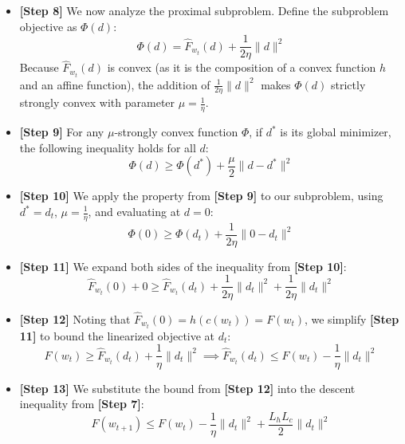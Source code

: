 \documentclass[11pt]{article}
\begin{document}
\begin{itemize}
    \item \textbf{[Step 8]} We now analyze the proximal subproblem. Define the subproblem objective as $\Phi(d)$:
    \begin{equation}
        \Phi(d) = \hat{F}_{w_t}(d) + \frac{1}{2\eta} \|d\|^2
    \end{equation}
    Because $\hat{F}_{w_t}(d)$ is convex (as it is the composition of a convex function $h$ and an affine function), the addition of $\frac{1}{2\eta}\|d\|^2$ makes $\Phi(d)$ strictly strongly convex with parameter $\mu = \frac{1}{\eta}$.
    
    \item \textbf{[Step 9]} For any $\mu$-strongly convex function $\Phi$, if $d^*$ is its global minimizer, the following inequality holds for all $d$:
    \begin{equation}
        \Phi(d) \geq \Phi(d^*) + \frac{\mu}{2} \|d - d^*\|^2
    \end{equation}
    
    \item \textbf{[Step 10]} We apply the property from \textbf{[Step 9]} to our subproblem, using $d^* = d_t$, $\mu = \frac{1}{\eta}$, and evaluating at $d = 0$:
    \begin{equation}
        \Phi(0) \geq \Phi(d_t) + \frac{1}{2\eta} \|0 - d_t\|^2
    \end{equation}
    
    \item \textbf{[Step 11]} We expand both sides of the inequality from \textbf{[Step 10]}:
    \begin{equation}
        \hat{F}_{w_t}(0) + 0 \geq \hat{F}_{w_t}(d_t) + \frac{1}{2\eta} \|d_t\|^2 + \frac{1}{2\eta} \|d_t\|^2
    \end{equation}
    
    \item \textbf{[Step 12]} Noting that $\hat{F}_{w_t}(0) = h(c(w_t)) = F(w_t)$, we simplify \textbf{[Step 11]} to bound the linearized objective at $d_t$:
    \begin{equation}
        F(w_t) \geq \hat{F}_{w_t}(d_t) + \frac{1}{\eta} \|d_t\|^2 \implies \hat{F}_{w_t}(d_t) \leq F(w_t) - \frac{1}{\eta} \|d_t\|^2
    \end{equation}
    
    \item \textbf{[Step 13]} We substitute the bound from \textbf{[Step 12]} into the descent inequality from \textbf{[Step 7]}:
    \begin{equation}
        F(w_{t+1}) \leq F(w_t) - \frac{1}{\eta} \|d_t\|^2 + \frac{L_h L_c}{2} \|d_t\|^2
    \end{equation}
    

\end{itemize}
\end{document}
